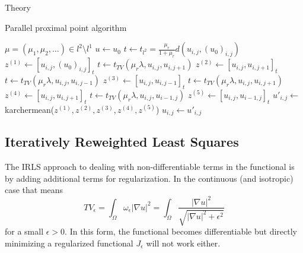 \begin{chapter}{Theory}
\begin{algorithm}
\caption{Parallel proximal point algorithm}
\label{al:parallel_prpt}
\begin{algorithmic}
\REQUIRE $\mu =(\mu_1,\mu_2, \ldots)\in l^2\setminus l^1$
\STATE $u \leftarrow u_0$
\STATE $t \leftarrow t_{l^{2}}=\frac{\mu_r}{1+\mu_r}d(u_{i,j},(u_0)_{i,j})$
\STATE $z^{(1)} \leftarrow [u_{i,j},(u_0)_{i,j}]_t$
\STATE $t \leftarrow  t_{TV}(\mu_r\lambda,u_{i,j},u_{i,j+1})$
\STATE $z^{(2)} \leftarrow [u_{i,j},u_{i,j+1}]_t$
\STATE $t \leftarrow  t_{TV}(\mu_r\lambda,u_{i,j},u_{i,j-1})$
\STATE $z^{(3)} \leftarrow [u_{i,j},u_{i,j-1}]_t$
\STATE $t \leftarrow  t_{TV}(\mu_r\lambda,u_{i,j},u_{i,j+1})$
\STATE $z^{(4)} \leftarrow [u_{i,j},u_{i,j+1}]_t$
\STATE $t \leftarrow  t_{TV}(\mu_r\lambda,u_{i,j},u_{i-1,j})$
\STATE $z^{(5)} \leftarrow [u_{i,j},u_{i-1,j}]_t$
\STATE $u'_{i,j} \leftarrow$ karchermean($z^{(1)},z^{(2)},z^{(3)},z^{(4)},z^{(5)}$)
\ENDFOR
{}
\STATE $u_{i,j} \leftarrow u'_{i,j}$
\ENDFOR
\ENDFOR
\end{algorithmic}
\end{algorithm}



\subsection{Iteratively Reweighted Least Squares} %
\label{sub:IRLS}
The IRLS approach to dealing with non-differentiable terms in the functional is by adding additional terms for regularization. In the continuous (and isotropic) case that means
\begin{equation}
    \label{eq:regulzarized_tv}
    TV_{\epsilon}=\int_{\Omega}\omega_{\epsilon}|\nabla u|^2 =\int_{\Omega}\frac{|\nabla u|^2}{\sqrt{|\nabla u|^2+\epsilon^2}}
\end{equation}
for a small $\epsilon>0$. In this form, the functional becomes differentiable but directly minimizing a
regularized functional $J_{\epsilon}$ will not work either.\\


\end{chapter}
